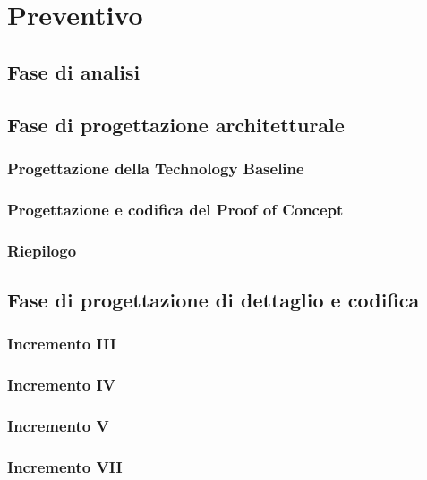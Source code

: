 \section{Preventivo} \label{preventivo}

\subsection{Fase di analisi}


\subsection{Fase di progettazione architetturale} \label{progettazione_architetturale}
\subsubsection{Progettazione della Technology Baseline}
\subsubsection{Progettazione e codifica del Proof of Concept}
\subsubsection{Riepilogo}


\subsection{Fase di progettazione di dettaglio e codifica}
\subsubsection{Incremento III}
\subsubsection{Incremento IV}
\subsubsection{Incremento V}
\subsubsection{Incremento VII}
